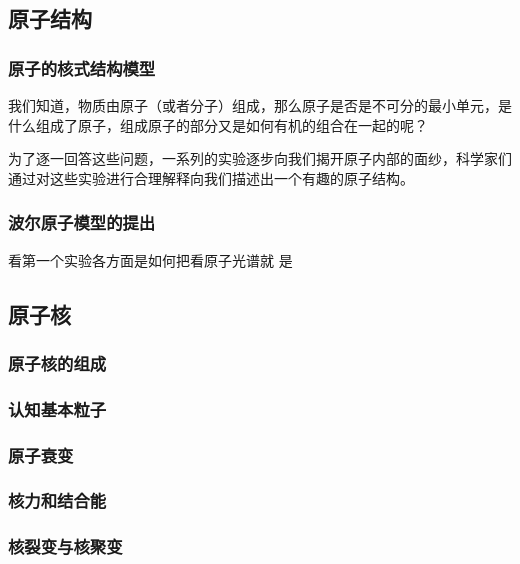\begin{issues}
\issueTODO
\end{issues}

\subsection{原子结构}
\subsubsection{原子的核式结构模型}
我们知道，物质由原子（或者分子）组成，那么原子是否是不可分的最小单元，是什么组成了原子，组成原子的部分又是如何有机的组合在一起的呢？

为了逐一回答这些问题，一系列的实验逐步向我们揭开原子内部的面纱，科学家们通过对这些实验进行合理解释向我们描述出一个有趣的原子结构。
\subsubsection{波尔原子模型的提出}%
看第一个实验各方面是如何把看原子光谱就 是
\subsection{原子核}
\subsubsection{原子核的组成}
\subsubsection{认知基本粒子}
\subsubsection{原子衰变}
\subsubsection{核力和结合能}
\subsubsection{核裂变与核聚变}